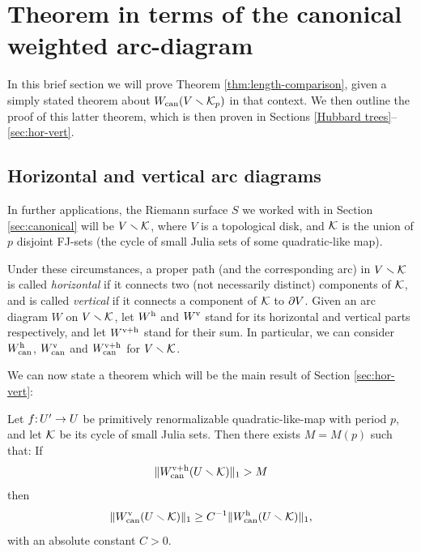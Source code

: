 \section{Theorem \protect{\ref{thm:length-comparison}} in terms of the canonical weighted arc-diagram} 
\label{sec:reduce-to-wcan}
In this brief section we will prove Theorem \ref{thm:length-comparison}, given a simply stated theorem about $W_{\operatorname{can}}(V \smallsetminus {\mathcal K}_p)$ in that context. 
We then outline the proof of this latter theorem, which is then proven in Sections \ref{Hubbard trees}--\ref{sec:hor-vert}.
 
 \subsection{Horizontal and vertical arc diagrams} \label{subsec:hv}
 
In further applications, the Riemann surface $S$ we worked with in Section \ref{sec:canonical} will be $V\smallsetminus {\mathcal K}$,
where $V$ is a topological disk, and ${\mathcal K}$ is the union of $p$ disjoint FJ-sets
(the cycle of small Julia sets of some quadratic-like map).

Under these circumstances,
a proper path (and the corresponding arc) in $V \smallsetminus {\mathcal K}$ is called {\it horizontal} if it connects two (not necessarily distinct) components of ${\mathcal K}$,
and is called {\it vertical} if it connects a component of ${\mathcal K}$ to $\partial V$.
Given an arc diagram $W$ on $V\smallsetminus {\mathcal K}$, let $W^{\mathrm{h}}$ and $W^{\mathrm{v}}$  stand for its horizontal and vertical parts respectively,
and let $W^{{\mathrm{v}}+{\mathrm{h}}}$ stand for their sum.
In particular, we can consider  $W_{\operatorname{can}}^{\mathrm{h}}$, $W_{\operatorname{can}}^{\mathrm{v}}$ and $W_{\operatorname{can}}^{{\mathrm{v}}+{\mathrm{h}}}$ for $V \smallsetminus {\mathcal K}$.

We can now state a theorem which will be the main result of Section \ref{sec:hor-vert}:
\begin{theorem}\label{def vertical teaser}
Let $f\mathpunct: U'\to U$ be primitively renormalizable quadratic-like-map with period $p$,
and let ${\mathcal K}$ be its cycle of small Julia sets.
Then there exists $M=M(p)$ such that:
If 
\begin{equation} \label{eq:teaser:hyp}
\| W_{\mathrm{can}}^{{\mathrm{v}}+{\mathrm{h}}}(U\smallsetminus {\mathcal K})\|_1 > M
\end{equation}
then
\begin{equation} \label{eq:teaser:conc}
 \|W^{\mathrm{v}}_{\mathrm{can}}(U\smallsetminus{\mathcal K})\|_1 \geq C^{-1} \| W^{\mathrm{h}}_{\mathrm{can}}(U\smallsetminus {\mathcal K})\|_1,
\end{equation}
with an absolute constant $C>0$.
\end{theorem}

